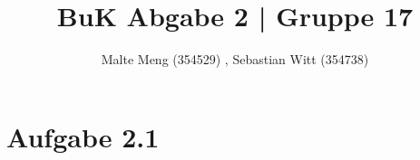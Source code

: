 \documentclass{article}
\title{BuK Abgabe 2 | Gruppe 17}
\author{Malte Meng (354529) , Sebastian Witt (354738)}
\begin{document}
	\maketitle 
	\section[a 2.1]{Aufgabe 2.1}
	
\end{document}
